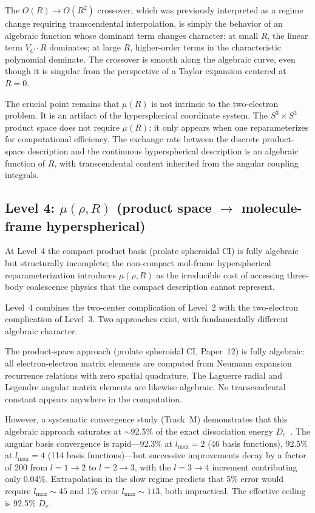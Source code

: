 \documentclass[aps,pra,twocolumn,superscriptaddress,longbibliography]{revtex4-2}
\begin{document}
The $O(R) \to O(R^2)$ crossover, which was previously interpreted
as a regime change requiring transcendental interpolation, is
simply the behavior of an algebraic function whose dominant term
changes character: at small $R$, the linear term $V_C \cdot R$
dominates; at large $R$, higher-order terms in the characteristic
polynomial dominate.  The crossover is smooth along the algebraic
curve, even though it is singular from the perspective of a Taylor
expansion centered at $R = 0$.

The crucial point remains that $\mu(R)$ is not intrinsic to the
two-electron problem.  It is an artifact of the hyperspherical
coordinate system.  The $S^3 \times S^3$ product space does not
require $\mu(R)$; it only appears when one reparameterizes for
computational efficiency.  The exchange rate between the discrete
product-space description and the continuous hyperspherical
description is an algebraic function of $R$, with transcendental
content inherited from the angular coupling integrals.


\subsection{Level 4: $\mu(\rho,R)$ (product space $\to$ molecule-frame hyperspherical)}
\label{sec:mu_level4}

At Level~4 the compact product basis (prolate spheroidal CI) is fully
algebraic but structurally incomplete; the non-compact mol-frame
hyperspherical reparameterization introduces $\mu(\rho,R)$ as the
irreducible cost of accessing three-body coalescence physics that the
compact description cannot represent.

Level~4 combines the two-center complication of Level~2 with the
two-electron complication of Level~3.  Two approaches exist, with
fundamentally different algebraic character.

The product-space approach (prolate spheroidal CI, Paper~12) is
fully algebraic: all electron-electron matrix elements are computed
from Neumann expansion recurrence relations with zero spatial
quadrature.  The Laguerre radial and Legendre angular matrix
elements are likewise algebraic.  No transcendental constant
appears anywhere in the computation.

However, a systematic convergence study (Track~M) demonstrates
that this algebraic approach saturates at $\sim$92.5\% of the
exact dissociation energy $D_e$~\cite{loutey_track_m}.  The
angular basis convergence is rapid---92.3\% at $l_{\max} = 2$
(46 basis functions), 92.5\% at $l_{\max} = 4$ (114 basis
functions)---but successive improvements decay by a factor of
200 from $l = 1 \to 2$ to $l = 2 \to 3$, with the $l = 3 \to 4$
increment contributing only 0.04\%.  Extrapolation in the slow
regime predicts that 5\% error would require $l_{\max} \sim 45$
and 1\% error $l_{\max} \sim 113$, both impractical.  The
effective ceiling is 92.5\% $D_e$.
\end{document}
